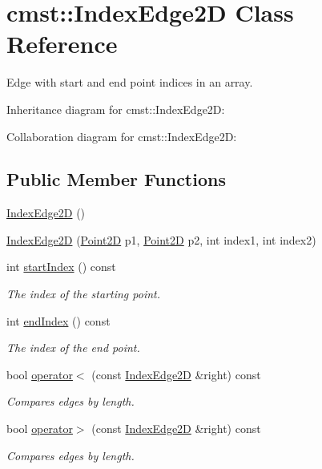 \hypertarget{classcmst_1_1_index_edge2_d}{}\section{cmst\+:\+:Index\+Edge2D Class Reference}
\label{classcmst_1_1_index_edge2_d}


Edge with start and end point indices in an array.  




Inheritance diagram for cmst\+:\+:Index\+Edge2D\+:


Collaboration diagram for cmst\+:\+:Index\+Edge2D\+:
\subsection*{Public Member Functions}
\begin{DoxyCompactItemize}
\item 
\hyperlink{classcmst_1_1_index_edge2_d_aace5c7209f868577cb353f309d4427fb}{Index\+Edge2D} ()
\item 
\hyperlink{classcmst_1_1_index_edge2_d_aa01ca9e529a319fffb5f500ab7218ef6}{Index\+Edge2D} (\hyperlink{classcmst_1_1_point2_d}{Point2D} p1, \hyperlink{classcmst_1_1_point2_d}{Point2D} p2, int index1, int index2)
\item 
int \hyperlink{classcmst_1_1_index_edge2_d_ab92c0b814ea9c354a71acfc84c871f72}{start\+Index} () const 
\begin{DoxyCompactList}\small\item\em The index of the starting point. \end{DoxyCompactList}\item 
int \hyperlink{classcmst_1_1_index_edge2_d_ad50c559d38e5857c03be255774deff12}{end\+Index} () const 
\begin{DoxyCompactList}\small\item\em The index of the end point. \end{DoxyCompactList}\item 
bool \hyperlink{classcmst_1_1_index_edge2_d_a96fc8ab0bb52c8c3aa8d5eed3a0034dd}{operator$<$} (const \hyperlink{classcmst_1_1_index_edge2_d}{Index\+Edge2D} \&right) const 
\begin{DoxyCompactList}\small\item\em Compares edges by length. \end{DoxyCompactList}\item 
bool \hyperlink{classcmst_1_1_index_edge2_d_a9b0f6b17a930986f99d30e03c34905c8}{operator$>$} (const \hyperlink{classcmst_1_1_index_edge2_d}{Index\+Edge2D} \&right) const 
\begin{DoxyCompactList}\small\item\em Compares edges by length. \end{DoxyCompactList}\end{DoxyCompactItemize}

